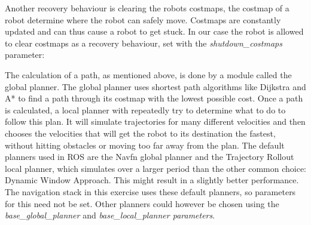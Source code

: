 

Another recovery behaviour is clearing the robots costmaps, the costmap of a robot determine where the robot can safely move. Costmaps are constantly updated and can thus cause a robot to get stuck. In our case the robot is allowed to clear costmaps as a recovery behaviour, set with the \emph{shutdown\_costmaps} parameter:



The calculation of a path, as mentioned above, is done by a module called the global planner. The global planner uses shortest path algorithms like Dijkstra and A* to find a path through its costmap with the lowest possible cost. Once a path is calculated, a local planner with repeatedly try to determine what to do to follow this plan. It will simulate trajectories for many different velocities and then chooses the velocities that will get the robot to its destination the fastest, without hitting obstacles or moving too far away from the plan. The default planners used in ROS are the Navfn global planner and the Trajectory Rollout local planner, which simulates over a larger period than the other common choice: Dynamic Window Approach. This might result in a slightly better performance. The navigation stack in this exercise uses these default planners, so parameters for this need not be set. Other planners could however be chosen using the \emph{base\_global\_planner} and \emph{base\_local\_planner parameters}.
 